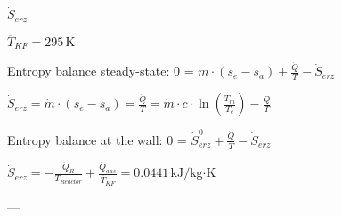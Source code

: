 \( \dot{S}_{erz} \)  

\( \overline{T}_{KF} = 295 \, \text{K} \)  

Entropy balance steady-state:  
0 = \( \dot{m} \cdot (s_{e} - s_{a}) + \frac{\dot{Q}}{T} - \dot{S}_{erz} \)  

\( \dot{S}_{erz} = \dot{m} \cdot (s_{e} - s_{a}) = \frac{\dot{Q}}{T} = \dot{m} \cdot c \cdot \ln \left( \frac{T_{m}}{T_{e}} \right) - \frac{\dot{Q}}{T} \)  

Entropy balance at the wall:  
0 = \( \dot{S}^{0}_{erz} + \frac{\dot{Q}}{T} - \dot{S}_{erz} \)  

\( \dot{S}_{erz} = -\frac{\dot{Q}_{R}}{T_{Reactor}} + \frac{\dot{Q}_{aus}}{\overline{T}_{KF}} = 0.0441 \, \text{kJ/kg·K} \)  

---